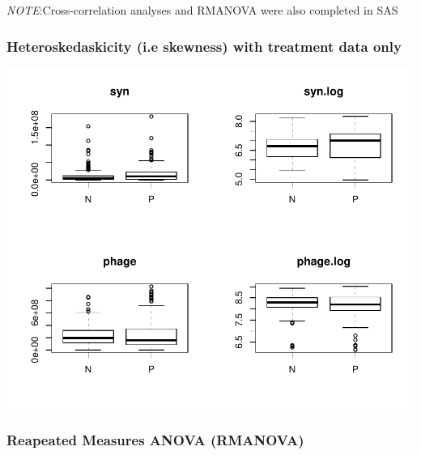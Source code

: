 \documentclass[]{article}
\begin{document}
\emph{NOTE}:Cross-correlation analyses and RMANOVA were also completed
in SAS

\subsubsection{Heteroskedaskicity (i.e skewness) with treatment data
only}\label{heteroskedaskicity-i.e-skewness-with-treatment-data-only}

\includegraphics{analysis_ecoevostoich_files/figure-latex/unnamed-chunk-12-1.pdf}

\newpage

\subsubsection{Reapeated Measures ANOVA
(RMANOVA)}\label{reapeated-measures-anova-rmanova}
\end{document}
